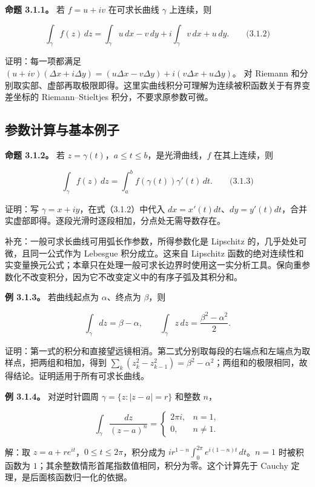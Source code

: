 \documentclass[11pt,a4paper]{article}
\begin{document}
\textbf{命题 3.1.1。} 若 \(f=u+iv\) 在可求长曲线 \(\gamma\) 上连续，则

\[
\int_\gamma f(z)\,dz
=\int_\gamma u\,dx-v\,dy
+i\int_\gamma v\,dx+u\,dy.
\qquad\text{(3.1.2)}
\]

证明：每一项都满足
\((u+iv)(\Delta x+i\Delta y)=(u\Delta x-v\Delta y)+i(v\Delta x+u\Delta y)\)。
对 Riemann
和分别取实部、虚部再取极限即得。这里实曲线积分可理解为连续被积函数关于有界变差坐标的
Riemann--Stieltjes 积分，不要求原参数可微。

\subsection{参数计算与基本例子}\label{ch03-s1-ux53c2ux6570ux8ba1ux7b97ux4e0eux57faux672cux4f8bux5b50}

\textbf{命题 3.1.2。} 若
\(z=\gamma(t)\)，\(a\le t\le b\)，是光滑曲线，\(f\) 在其上连续，则

\[
\int_\gamma f(z)\,dz
=\int_a^b f(\gamma(t))\gamma'(t)\,dt.
\qquad\text{(3.1.3)}
\]

证明：写 \(\gamma=x+iy\)，在式（3.1.2）中代入
\(dx=x'(t)dt\)、\(dy=y'(t)dt\)，合并实虚部即得。逐段光滑时逐段相加，分点处无需导数存在。

补充：一般可求长曲线可用弧长作参数，所得参数化是 Lipschitz
的，几乎处处可微，且同一公式作为 Lebesgue 积分成立。这来自 Lipschitz
函数的绝对连续性和实变量换元公式；本章只在处理一般可求长边界时使用这一实分析工具。保向重参数化不改变积分，因为它不改变定义中的有序子弧及其积分和。

\textbf{例 3.1.3。} 若曲线起点为 \(\alpha\)、终点为 \(\beta\)，则

\[
\int_\gamma dz=\beta-\alpha,
\qquad
\int_\gamma z\,dz=\frac{\beta^2-\alpha^2}{2}.
\]

证明：第一式的积分和直接望远镜相消。第二式分别取每段的右端点和左端点为取样点，把两组和相加，得到
\(\sum_k(z_k^2-z_{k-1}^2)=\beta^2-\alpha^2\)；两组和的极限相同，故得结论。证明适用于所有可求长曲线。

\textbf{例 3.1.4。} 对逆时针圆周 \(\gamma=\{z:|z-a|=r\}\) 和整数 \(n\)，

\[
\int_\gamma\frac{dz}{(z-a)^n}
=\begin{cases}2\pi i,&n=1,\\0,&n\ne1.\end{cases}
\]

解：取 \(z=a+re^{it}\)，\(0\le t\le2\pi\)，积分成为
\(ir^{1-n}\int_0^{2\pi}e^{i(1-n)t}\,dt\)。\(n=1\) 时被积函数为
\(1\)；其余整数情形首尾指数值相同，积分为零。这个计算先于 Cauchy
定理，是后面核函数归一化的依据。
\end{document}
